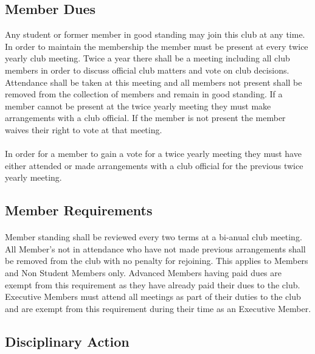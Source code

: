 \documentclass[12pt]{article}
\begin{document}
%
%
\subsection{Member Dues}
Any student or former member in good standing may join this club at any time. In order to maintain the membership the member must be present at every twice yearly club meeting. Twice a year there shall be a meeting including all club members in order to discuss official club matters and vote on club decisions. Attendance shall be taken at this meeting and all members not present shall be removed from the collection of members and remain in good standing. If a member cannot be present at the twice yearly meeting they must make arrangements with a club official. If the member is not present the member waives their right to vote at that meeting.

\paragraph{}
In order for a member to gain a vote for a twice yearly meeting they must have either attended or made arrangements with a club official for the previous twice yearly meeting. 

\subsection{Member Requirements}
\paragraph{}
Member standing shall be reviewed every two terms at a bi-anual club meeting. All Member's not in attendance who have not made previous arrangements shall be removed from the club with no penalty for rejoining. This applies to Members and Non Student Members only. Advanced Members having paid dues are exempt from this requirement as they have already paid their dues to the club. Executive Members must attend all meetings as part of their duties to the club and are exempt from this requirement during their time as an Executive Member.

\subsection{Disciplinary Action}
\end{document}
